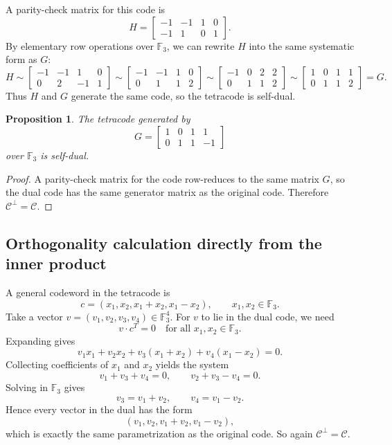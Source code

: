 \documentclass[11pt]{article}
\newtheorem{proposition}{Proposition}[section]
\theoremstyle{definition}
\theoremstyle{remark}
\newcommand{\F}{\mathbb{F}}
\newcommand{\code}{\mathcal{C}}
\newcommand{\dual}[1]{#1^{\perp}}
\begin{document}
A parity-check matrix for this code is
\[
H=
\begin{bmatrix}
-1&-1&1&0\\
-1&1&0&1
\end{bmatrix}.
\]
By elementary row operations over $\F_3$, we can rewrite $H$ into the same systematic form as $G$:
\[
H
\sim
\begin{bmatrix}
-1&-1&1&0\\
0&2&-1&1
\end{bmatrix}
\sim
\begin{bmatrix}
-1&-1&1&0\\
0&1&1&2
\end{bmatrix}
\sim
\begin{bmatrix}
-1&0&2&2\\
0&1&1&2
\end{bmatrix}
\sim
\begin{bmatrix}
1&0&1&1\\
0&1&1&2
\end{bmatrix}=G.
\]
Thus $H$ and $G$ generate the same code, so the tetracode is self-dual.

\begin{proposition}
The tetracode generated by
\[
G=
\begin{bmatrix}
1&0&1&1\\
0&1&1&-1
\end{bmatrix}
\]
over $\F_3$ is self-dual.
\end{proposition}

\begin{proof}
A parity-check matrix for the code row-reduces to the same matrix $G$, so the dual code has the same generator matrix as the original code. Therefore $\dual{\code}=\code$.
\end{proof}

\subsection{Orthogonality calculation directly from the inner product}

A general codeword in the tetracode is
\[
c=(x_1,x_2,x_1+x_2,x_1-x_2), \qquad x_1,x_2\in\F_3.
\]
Take a vector $v=(v_1,v_2,v_3,v_4)\in\F_3^4$. For $v$ to lie in the dual code, we need
\[
v\cdot c^T=0
\quad\text{for all }x_1,x_2\in\F_3.
\]
Expanding gives
\[
v_1x_1+v_2x_2+v_3(x_1+x_2)+v_4(x_1-x_2)=0.
\]
Collecting coefficients of $x_1$ and $x_2$ yields the system
\[
v_1+v_3+v_4=0,
\qquad
v_2+v_3-v_4=0.
\]
Solving in $\F_3$ gives
\[
v_3=v_1+v_2,
\qquad
v_4=v_1-v_2.
\]
Hence every vector in the dual has the form
\[
(v_1,v_2,v_1+v_2,v_1-v_2),
\]
which is exactly the same parametrization as the original code. So again $\dual{\code}=\code$.
\end{document}

